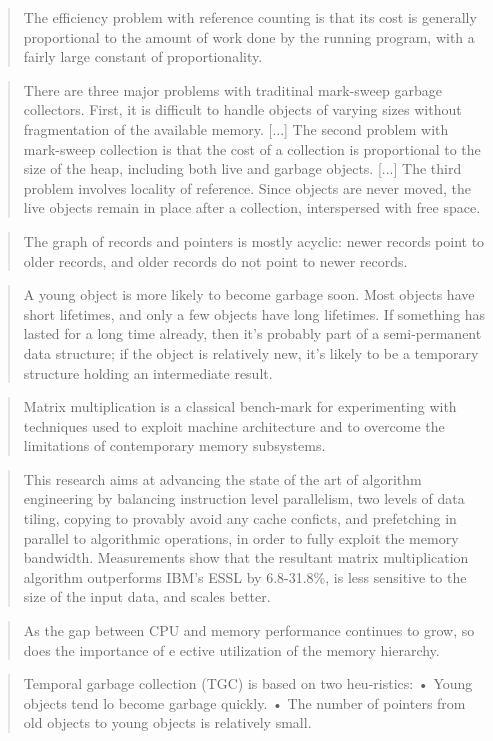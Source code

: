 \documentclass[a4paper,oneside]{memoir}
\begin{document}
\blockquote{The efficiency problem with reference counting is that its cost is
generally proportional to the amount of work done by the running program, with a
fairly large constant of proportionality.}
\cite{Wilson:1992}

\blockquote{There are three major problems with traditinal mark-sweep garbage
collectors. First, it is difficult to handle objects of varying sizes without
fragmentation of the available memory. [...] The second problem with mark-sweep
collection is that the cost of a collection is proportional to the size of the
heap, including both live and garbage objects. [...] The third problem involves
locality of reference. Since objects are never moved, the live objects remain in
place after a collection, interspersed with free space. \cite{Wilson:1992}}

\blockquote{The graph of records and pointers is mostly acyclic: newer records
point to older records, and older records do not point to newer records.}
\cite{Appel:1989}

\blockquote{A young object is more likely to become garbage soon. Most objects
have short lifetimes, and only a few objects have long lifetimes. If something
has lasted for a long time already, then it’s probably part of a semi-permanent
data structure; if the object is relatively new, it’s likely to be a temporary
structure holding an intermediate result. \cite{Appel:1989}}

\blockquote{Matrix multiplication is a classical bench-mark for experimenting
with techniques used to exploit machine architecture and to overcome the
limitations of contemporary memory subsystems.}
\cite{Eiron:1999}

\blockquote{This research aims at advancing the state of the art of algorithm
engineering by balancing instruction level parallelism, two levels of data
tiling, copying to provably avoid any cache conficts, and prefetching in
parallel to algorithmic operations, in order to fully exploit the memory
bandwidth. Measurements show that the resultant matrix multiplication algorithm
outperforms IBM's ESSL by 6.8-31.8\%, is less sensitive to the size of the
input data, and scales better. \cite{Eiron:1999}}

\blockquote{As the gap between CPU and memory performance continues to grow, so
does the importance of e ective utilization of the memory hierarchy.}
\cite{Eiron:1999}

\blockquote{Temporal garbage collection (TGC) is based on two heu-ristics:
• Young objects tend lo become garbage quickly.
• The number of pointers from old objects to young objects is relatively small.}
\cite{Courts:1988}
\end{document}
